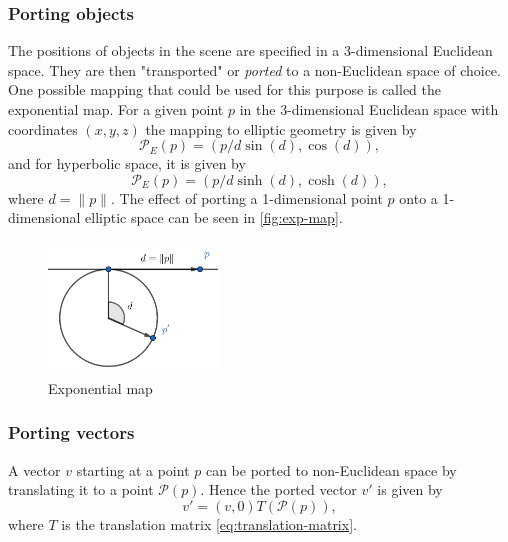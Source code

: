 \subsubsection*{Porting objects}
The positions of objects in the scene are specified in a 3-dimensional Euclidean space.
They are then "transported" or \textit{ported} to a non-Euclidean space of choice.
One possible mapping that could be used for this purpose is called the exponential map.
For a given point $p$ in the 3-dimensional Euclidean space with coordinates $(x, y, z)$ the mapping to elliptic geometry is given by
\begin{equation} \label{eq:elliptic-porting}
    \mathcal{P}_E(p) = (p / d \sin(d), \cos(d)),
\end{equation}
and for hyperbolic space, it is given by
\begin{equation*}
    \mathcal{P}_E(p) = (p / d \sinh(d), \cosh(d)),
\end{equation*}
where $d = \lVert p \rVert$.
The effect of porting a 1-dimensional point $p$ onto a 1-dimensional elliptic space can be seen in \autoref{fig:exp-map}.
\begin{figure}[h]
    \centering
    \includegraphics[width=0.4\textwidth]{chapters/theoretical_foundations/sections/non-eudlidean-spaces/resources/exp-map.png}
    \caption{Exponential map}
    \label{fig:exp-map}
\end{figure}

\subsubsection*{Porting vectors}
A vector $v$ starting at a point $p$ can be ported to non-Euclidean space by translating it to a point $\mathcal{P}(p)$.
Hence the ported vector $v'$ is given by
\begin{equation*}
    v' = (v, 0) T(\mathcal{P}(p)),
\end{equation*}
where $T$ is the translation matrix \ref{eq:translation-matrix}.